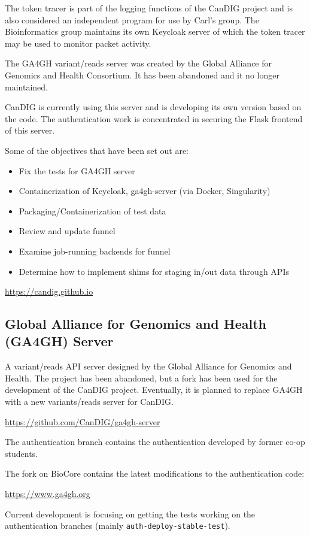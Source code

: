 \documentclass{article}
\begin{document}
The token tracer is part of the logging functions of the CanDIG project and is also considered an independent program for use by Carl's group. The Bioinformatics group maintains its own Keycloak server of which the token
tracer may be used to monitor packet activity.

The GA4GH variant/reads server was created by the Global Alliance for Genomics and Health Consortium. It has been abandoned and it no longer maintained.

CanDIG is currently using this server and is developing its own version based on the code. The authentication work is concentrated in securing the Flask frontend of this server.

Some of the objectives that have been set out are:

\begin{itemize}
\item Fix the tests for GA4GH server
\item Containerization of Keycloak, ga4gh-server (via Docker, Singularity)
\item Packaging/Containerization of test data
\item Review and update funnel
\item Examine job-running backends for funnel
\item Determine how to implement shims for staging in/out data through APIs
\end{itemize}

\url{https://candig.github.io}

\subsection{Global Alliance for Genomics and Health (GA4GH) Server}

A variant/reads API server designed by 
the Global Alliance for Genomics and Health.
The project has been abandoned, but a fork has been used
for the development of the CanDIG project.
Eventually, it is planned to replace GA4GH with a new 
variants/reads server for CanDIG.

\url{https://github.com/CanDIG/ga4gh-server}

The authentication branch contains the authentication
developed by former co-op students.

The fork on BioCore contains the latest modifications
to the authentication code:

\url{https://www.ga4gh.org}

Current development is focusing on getting the tests working
on the authentication branches (mainly \texttt{auth-deploy-stable-test}).
\end{document}

